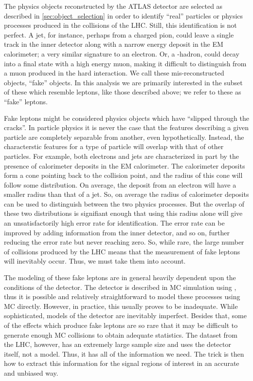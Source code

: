 


The physics objects reconstructed by the ATLAS detector are selected
as described in \sec\ref{sec:object_selection} in order to 
identify ``real'' particles or physics processes produced in the collisions
of the LHC. Still, this identification is not perfect. A jet,
for instance, perhaps from a charged pion, could leave a single
track in the inner detector along with a narrow energy deposit in the
EM calorimeter; a very similar signature to an electron. Or, 
a \bee-hadron, could decay into a final state with a high energy muon,
making it difficult to distinguish from a muon produced in the hard interaction.
We call these mis-reconstructed objects, ``fake'' objects. 
In this analysis we are primarily interested in the subset of these 
which resemble leptons, like those described above; we refer
to these as ``fake'' leptons.

Fake leptons might be considered physics objects which have 
``slipped through the cracks''. In particle physics it is 
never the case that the features describing 
a given particle are completely separable
from another, even hypothetically. Instead,
the characterstic features for a type of particle will 
overlap with that of other particles. For example, both electrons
and jets are characterized in part by the presence of calorimeter
deposits in the EM calorimeter. 
The calorimeter deposits form a cone 
pointing back to the collision point, and the radius
of this cone will follow some distribution. On average,
the deposit from an electron will have a smaller radius 
than that of a jet. So, on average the radius of calorimeter
deposits can be used to distinguish between the two physics
processes. But the overlap of these two distributions is 
signifiant enough that using this radius alone
will give an unsatisfactorily high error rate for identification.
The error rate can be improved by adding information 
from the inner detector, and so on, further reducing
the error rate but never reaching zero.
So, while rare, the large number of collisions produced by the LHC
means that the measurement of fake leptons will inevitably occur. 
Thus, we must take them into account.

The modeling of these fake leptons are in general 
heavily dependent upon the conditions of the detector. 
The detector is described in MC simulation using \geant, thus
it is possible and relatively straightforward 
to model these processes using MC directly.
However, in practice, this usually proves to be inadequate.
While sophisticated, models of the detector are inevitably imperfect.
Besides that, some of the effects which produce fake leptons 
are so rare that it may be difficult to generate enough MC
collisions to obtain adequate statistics.
The dataset from the LHC, however, has an extremely large sample size
and uses the detector itself, not a model. Thus, it has all of the 
information we need. The trick is then how to extract this information
for the signal regions of interest in an accurate and unbiased way.


